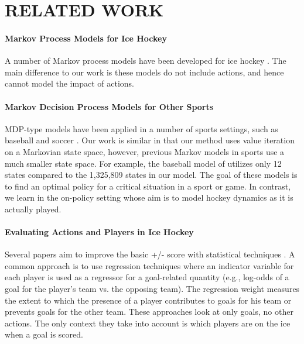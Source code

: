 \documentclass[]{article}
\begin{document}

\section{RELATED WORK}
\label{sec:related-work}




\paragraph{Markov Process Models for Ice Hockey} A number of Markov process models have been developed for ice hockey \citep{Thomas2013,Buttrey2011}. The main difference to our work is these models do not include actions, and hence cannot model the impact of actions.


\paragraph{Markov Decision Process Models for Other Sports} MDP-type models have been applied in a number of sports settings, such as baseball
\citep{Sidhu2014} and soccer \citep{Hirotsu2002}.%
Our work is similar in that our method uses value iteration on a Markovian state space, however, previous Markov models in sports use a much smaller state space.
For example, the baseball model of \citep{Sidhu2014} utilizes only 12 states compared to the 1,325,809 states in our model.
The goal of these models is to find an optimal policy for a critical situation in a sport or game.
In contrast, we learn in the on-policy setting whose aim is to model hockey dynamics as it is actually played.




\paragraph{Evaluating Actions and Players in Ice Hockey} Several papers aim to improve the basic +/- score with statistical techniques \citep{Macdonald2011a,Gramacy2013,Spagnola2013}. A common approach is to use regression techniques where an indicator variable for each player is used as a regressor for a goal-related quantity (e.g., log-odds of a goal for the player's team vs. the opposing team). The regression weight measures the extent to which the presence of a player contributes to goals for his team or prevents goals for the other team. These approaches look at only goals, no other actions. The only context they take into account is which players are on the ice when a goal is scored.
\end{document}
